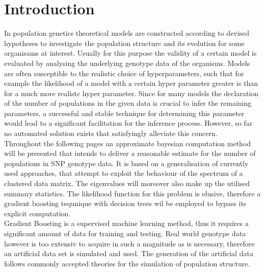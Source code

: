\documentclass[a4paper, 11pt]{article}
\begin{document}
\section{Introduction}
In population genetics theoretical models are constructed according to devised hypotheses to investigate the population structure and its evolution for some organisams at interest. Usually for this purpose the validity of a certain model is evaluated by analysing the underlying genotype data of the organisms. Models are often susceptible to the realistic choice of hyperparameters, such that for example the likelihood of a model with a certain hyper parameter greater is than for a much more realistc hyper parameter. Since for many models the declaration of the number of populations in the given data is crucial to infer the remaining parameters, a successful and stable technique for determining this parameter would lead to a significant facilitation for the inference process. However, so far no automated solution exists that satisfyingly alleviate this concern. \\
Throughout the following pages an approximate bayesian computation method will be presented that intends to deliver a reasonable estimate for the number of populations in SNP genotype data. It is based on a generalisation of currently used approaches, that attempt to exploit the behaviour of the spectrum of a clustered data matrix. The eigenvalues will moreover also make up the utilised summary statistics. The likelihood function for this problem is elusive, therefore a gradient boosting tequnique with decision trees wil be employed to bypass its explicit computation. \\
Gradient Boosting is a supervised machine learning method, thus it requires a significant amount of data for training and testing. Real world genotype data however is too extensiv to acquire in such a magnitude as is necessary, therefore an artificial data set is simulated and used. The generation of the artificial data follows commonly accepted theories for the simulation of population structure.
\end{document}

